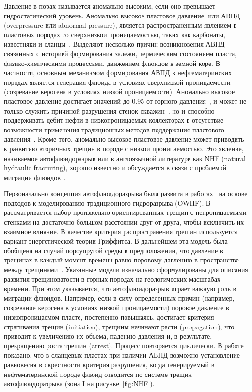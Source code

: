 Давление в порах называется аномально высоким, если оно превышает гидростатический уровень. Аномально высокое пластовое давление, или АВПД (overpressure или abnormal pressure), является распространенным явлением в пластовых породах со сверхнизкой проницаемостью, таких как карбонаты, известняки и сланцы~\autocite{fertl1976abnormal, luo2002natural, melik1983, magara1978significance}. Выделяют несколько причин возникновения АВПД связанных с историей формирования залежи, термическим состоянием пласта, физико-химическими процессами, движением флюидов в земной коре. В частности, основным механизмом формирования АВПД в нефтематеринских породах является генерация флюида в условиях сверхнизкой проницаемости (созревание керогена в условиях низкой проницаемости). Аномально высокое пластовое давление достигает значений до 0.95 от горного давления~\autocite{li2012pore}, и может не только служить причиной разрушения стенок скважин~\autocite{melik1983, li2012pore}, но и способно поддерживать дебит нефти в низкопроницаемых коллекторах в отсутствие возможности применения традиционных методов поддержания пластового давления~\autocite{sonnenberg2009petroleum}. Кроме того, аномально высокое пластовое давление может приводить к развитию вторичных трещин в породе с низкой проницаемостью. Это явление, называемое автофлюидоразрыв или в англоязычной литературе как NHF (natural hydraulic fracturing), хорошо известно и обсуждается в связи с проблемой миграции флюидов~\autocite{secor1965role, engelder1990natural, luo2002natural}.

Первоначально концепция автофлюидоразрыва была развита в работах~\autocite{secor1965role} на основе подходов к моделированию традиционного гидроразрыва (OWHF). В~\autocite{secor1965role} рассматривается набор произвольно ориентированных трещин с непроницаемыми стенками на достаточно большом расстоянии друг от друга, чтобы исключить их взаимное влияние. В качестве критерия распространения трещин используется вариант энергетической теории Гриффитса. В дальнейшем эта модель была обобщена на случай пороупругой среды в предположении, что давление в трещинах в каждый момент времени равно поровому давлению в пространстве между трещинами~\autocite{engelder1990natural}. Указанные модели изначально сформулированы для описания развития трещиноватости в горных породах на геологических масштабах времени. При этом указывается, что автофлюидоразрыв играет важную роль в миграции флюидов. Например, если в силу определенных причин (например, созревание керогена в условиях низкой проницаемости) поровое давление в низкопроницаемом пласте, постепенно повышаясь, достигает критерия страгивания трещин (initiation), трещины начинают расти (propagation), что приводит к увеличению их объема, падению давления и, в результате, прекращению роста трещин (arrest). Процесс повторяется циклически. В работе~\autocite{luo2002natural} показано, что в сланцевых пластах при наличии АВПД возможно установление равновесия в окрестности критерия разрушения, когда генерируемый в нефтематеринской породе флюид отводится по системе трещин автофлюидоразрыва (зона I на рисунке~\ref{fig:NHF}).

